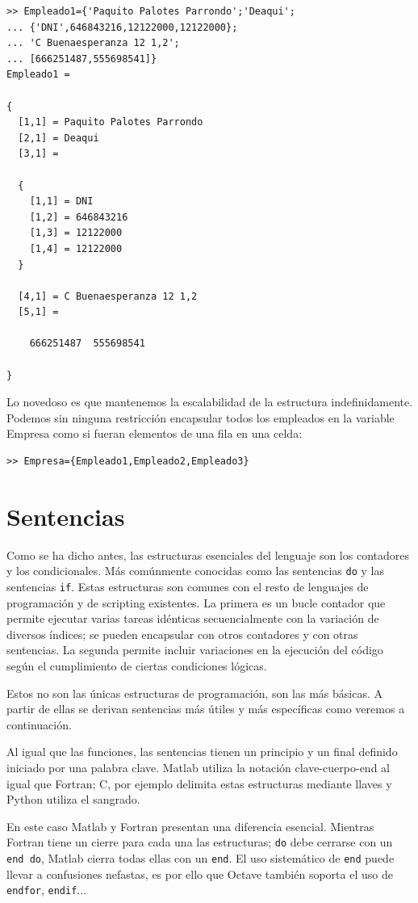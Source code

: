\begin{lstlisting}
>> Empleado1={'Paquito Palotes Parrondo';'Deaqui';
... {'DNI',646843216,12122000,12122000};
... 'C Buenaesperanza 12 1,2';
... [666251487,555698541]}
Empleado1 =

{
  [1,1] = Paquito Palotes Parrondo
  [2,1] = Deaqui
  [3,1] =

  {
    [1,1] = DNI
    [1,2] = 646843216
    [1,3] = 12122000
    [1,4] = 12122000
  }

  [4,1] = C Buenaesperanza 12 1,2
  [5,1] =

    666251487  555698541

}
\end{lstlisting}
Lo novedoso es que mantenemos la escalabilidad de la estructura
indefinidamente.  Podemos sin ninguna restricción encapsular todos
los empleados en la variable Empresa como si fueran elementos de
una fila en una celda:

\begin{lstlisting}
>> Empresa={Empleado1,Empleado2,Empleado3}
\end{lstlisting}

\section{Sentencias}

Como se ha dicho antes, las estructuras esenciales del lenguaje son
los contadores y los condicionales. Más comúnmente conocidas como las
sentencias \texttt{do} y las sentencias \texttt{if}. Estas estructuras
son comunes con el resto de lenguajes de programación y de scripting
existentes. La primera es un bucle contador que permite ejecutar
varias tareas idénticas secuencialmente con la variación de diversos
índices; se pueden encapsular con otros contadores y con otras
sentencias.  La segunda permite incluir variaciones en la ejecución
del código según el cumplimiento de ciertas condiciones lógicas.

Estos no son las únicas estructuras de programación, son las más
básicas.  A partir de ellas se derivan sentencias más útiles y más
específicas como veremos a continuación.

Al igual que las funciones, las sentencias tienen un principio y un
final definido iniciado por una palabra clave.  Matlab utiliza la
notación clave-cuerpo-end al igual que Fortran; C, por ejemplo
delimita estas estructuras mediante llaves y Python utiliza el
sangrado.

En este caso Matlab y Fortran presentan una diferencia esencial.
Mientras Fortran tiene un cierre para cada una las estructuras;
\texttt{do} debe cerrarse con un \texttt{end do}, Matlab cierra todas
ellas con un \texttt{end}.  El uso sistemático de \texttt{end} puede
llevar a confusiones nefastas, es por ello que Octave también soporta
el uso de \texttt{endfor}, \texttt{endif}...


